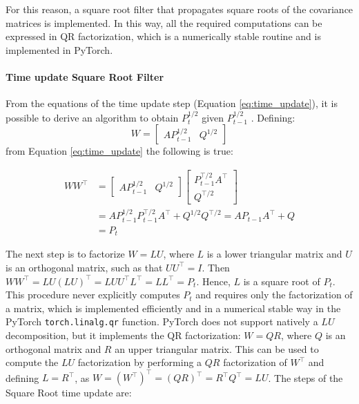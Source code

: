 \documentclass{article}
\begin{document}
For this reason, a square root filter that propagates square roots of the covariance matrices is implemented. In this way, all the required computations can be expressed in QR factorization, which is a numerically stable routine and is implemented in \textsf{PyTorch}.

\paragraph{Time update Square Root Filter}

From the equations of the time update step (Equation \ref{eq:time_update}), it is possible to derive an algorithm to obtain $P_t^{1/2}$ given $P_{t-1}^{1/2}$ \cite[eq. 6.60]{mohinder_s_grewal_kalman_2001}. Defining:
\begin{equation*}
    W = \begin{bmatrix}AP_{t-1}^{1/2} & Q^{1/2}\end{bmatrix}
\end{equation*}
from Equation \ref{eq:time_update} the following is true:


\begin{align*}
  WW^\top &=  \begin{bmatrix}AP_{t-1}^{1/2} & Q^{1/2}\end{bmatrix}\begin{bmatrix}P_{t-1}^{\top/2}A^\top \\ Q^{\top/2}\end{bmatrix}
  \\ &= AP_{t-1}^{1/2}P_{t-1}^{\top/2}A^\top + Q^{1/2}Q^{\top/2} = AP_{t-1}A^\top + Q\\ &= P_t
\end{align*}

The next step is to factorize  $W=LU$, where $L$ is a lower triangular matrix and $U$ is an orthogonal matrix, such as that $UU^\top = I$. Then $WW^\top = LU(LU)^\top = LUU^\top L^\top = LL^\top=P_t$. Hence, $L$ is a square root of $P_t$.
This procedure never explicitly computes $P_t$ and requires only the factorization of a matrix, which is implemented efficiently and in a numerical stable way in the \textsf{PyTorch} \verb|torch.linalg.qr| function.
PyTorch does not support natively a $LU$ decomposition, but it implements the QR factorization: $W=QR$, where $Q$ is an orthogonal matrix and $R$ an upper triangular matrix. This can be used to compute the $LU$ factorization by performing a $QR$ factorization of $W^\top$ and defining $L = R^\top$, as $W=(W^\top)^\top=(QR)^\top=R^\top Q^\top=LU$.
The steps of the Square Root time update are:
\end{document}
